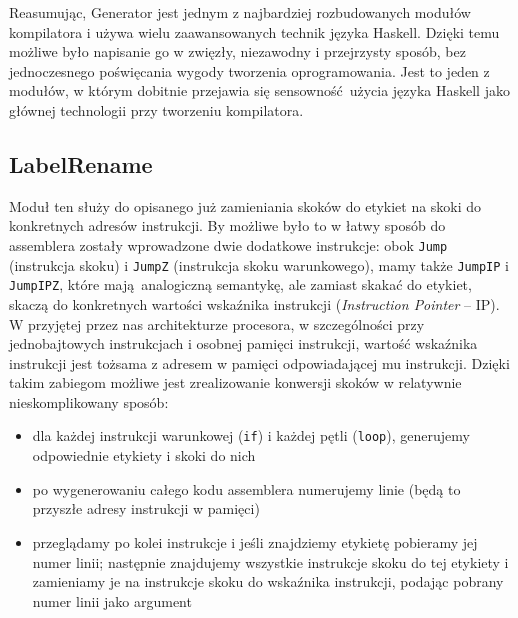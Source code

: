 Reasumując, Generator jest jednym z najbardziej rozbudowanych modułów kompilatora i używa wielu zaawansowanych technik języka Haskell. Dzięki temu możliwe było napisanie go w zwięzły, niezawodny i przejrzysty sposób, bez jednoczesnego poświęcania wygody tworzenia oprogramowania. Jest to jeden z modułów, w którym dobitnie przejawia się sensowność użycia języka Haskell jako głównej technologii przy tworzeniu kompilatora.

\subsection{LabelRename}

Moduł ten służy do opisanego już zamieniania skoków do etykiet na skoki do konkretnych adresów instrukcji. By możliwe było to w łatwy sposób do assemblera zostały wprowadzone dwie dodatkowe instrukcje: obok \texttt{Jump} (instrukcja skoku) i \texttt{JumpZ} (instrukcja skoku warunkowego), mamy także \texttt{JumpIP} i \texttt{JumpIPZ}, które mają analogiczną semantykę, ale zamiast skakać do etykiet, skaczą do konkretnych wartości wskaźnika instrukcji (\textit{Instruction Pointer} -- IP). W przyjętej przez nas architekturze procesora, w szczególności przy jednobajtowych instrukcjach i osobnej pamięci instrukcji, wartość wskaźnika instrukcji jest tożsama z adresem w pamięci odpowiadającej mu instrukcji. Dzięki takim zabiegom możliwe jest zrealizowanie konwersji skoków w relatywnie nieskomplikowany sposób:

\begin{itemize}
  \item dla każdej instrukcji warunkowej (\texttt{if}) i każdej pętli (\texttt{loop}), generujemy odpowiednie etykiety i skoki do nich
  \item po wygenerowaniu całego kodu assemblera numerujemy linie (będą to przyszłe adresy instrukcji w pamięci)
  \item przeglądamy po kolei instrukcje i jeśli znajdziemy etykietę pobieramy jej numer linii; następnie znajdujemy wszystkie instrukcje skoku do tej etykiety i zamieniamy je na instrukcje skoku do wskaźnika instrukcji, podając pobrany numer linii jako argument
\end{itemize}

